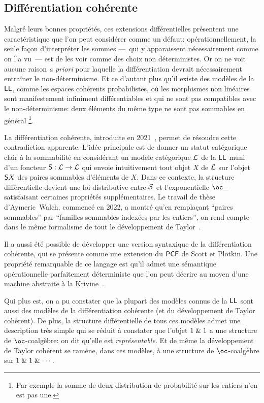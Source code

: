 \documentclass[a4]{article}
\begin{document}

\subsection*{Différentiation cohérente}
Malgré leurs bonnes propriétés, ces extensions différentielles
présentent une caractéristique que l'on peut considérer comme un
défaut: opérationnellement, la seule façon d'interpréter les sommes
---~qui y apparaissent nécessairement comme on l'a vu~--- est de les
voir comme des choix non déterministes.
%
Or on ne voit aucune raison \emph{a priori} pour laquelle la
différentiation devrait nécessairement entraîner le non-déterminisme.
%
Et ce d'autant plus qu'il existe des modèles de la $\hbox{\textsf{LL}}$, comme les
espaces cohérents probabilistes, où les morphismes non linéaires sont
manifestement infiniment différentiables et qui ne sont pas
compatibles avec le non-déterminisme: deux éléments du même type ne
sont pas sommables en général%
\footnote{Par exemple la somme de deux distribution de probabilité sur
  les entiers n'en est pas une.}.

La différentiation cohérente, introduite en 2021~\cite{Ehrhard23a},
permet de résoudre cette contradiction apparente.
%
L'idée principale est de donner un statut catégorique clair à la
sommabilité en considérant un modèle catégorique $\mathcal{L}$ de la $\hbox{\textsf{LL}}$
muni d'un foncteur ${\mathsf S}:\mathcal{L}\to\mathcal{L}$ qui envoie intuitivement tout
objet $X$ de $\mathcal{L}$ sur l'objet ${\mathsf S} X$ des paires sommables
d'éléments de $X$.
%
Dans ce contexte, la structure différentielle devient une loi
distributive entre $\mathcal{S}$ et l'exponentielle $\Oc\_$ satisfaisant
certaines propriétés supplémentaires.
%
Le travail de thèse d'Aymeric~Walch, commencé en 2022, a montré qu'en
remplaçant ``paires sommables'' par ``familles sommables indexées par
les entiers'', on rend compte dans le même formalisme de tout le
développement de Taylor~\cite{EhrhardWalch23b}.

Il a aussi été possible de développer une version syntaxique de la
différentiation cohérente, qui se présente comme une extension du
$\mathsf{PCF}$ de Scott et Plotkin.
%
Une propriété remarquable de ce langage est qu'il admet une sémantique
opérationnelle parfaitement déterministe que l'on peut décrire au
moyen d'une machine abstraite à la Krivine~\cite{Ehrhard23b}.
%

Qui plus est, on a pu constater que la plupart des modèles connus de
la $\hbox{\textsf{LL}}$ sont aussi des modèles de la différentiation cohérente (et du
développement de Taylor cohérent).
%
De plus, la structure différentielle de tous ces modèles admet une
description très simple qui se réduit à constater que l'objet
${1}\mathrel{\&}{1}$ a une structure de $\oc$-coalgèbre: on dit qu'elle
est \emph{représentable}.
%
Et de même la développement de Taylor cohérent se ramène, dans ces
modèles, à une structure de $\oc$-coalgèbre sur
$1\mathrel{\&}1\mathrel{\&}\cdots$.
\end{document}
